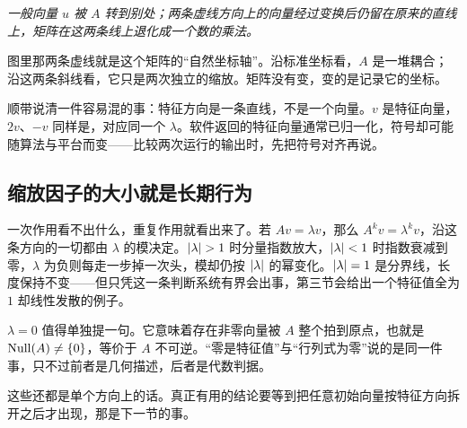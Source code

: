 \begin{center}

\emph{一般向量 \(u\) 被 \(A\) 转到别处；两条虚线方向上的向量经过变换后仍留在原来的直线上，矩阵在这两条线上退化成一个数的乘法。}
\end{center}

图里那两条虚线就是这个矩阵的``自然坐标轴''。沿标准坐标看，\(A\) 是一堆耦合；沿这两条斜线看，它只是两次独立的缩放。矩阵没有变，变的是记录它的坐标。

顺带说清一件容易混的事：特征方向是一条直线，不是一个向量。\(v\) 是特征向量，\(2v\)、\(-v\) 同样是，对应同一个 \(\lambda\)。软件返回的特征向量通常已归一化，符号却可能随算法与平台而变——比较两次运行的输出时，先把符号对齐再说。

\subsection{缩放因子的大小就是长期行为}

一次作用看不出什么，重复作用就看出来了。若 \(Av=\lambda v\)，那么 \(A^k v=\lambda^k v\)，沿这条方向的一切都由 \(\lambda\) 的模决定。\(\abs{\lambda}>1\) 时分量指数放大，\(\left|\lambda\right|<1\) 时指数衰减到零，\(\lambda\) 为负则每走一步掉一次头，模却仍按 \(\left|\lambda\right|\) 的幂变化。\(\left|\lambda\right|=1\) 是分界线，长度保持不变——但只凭这一条判断系统有界会出事，第三节会给出一个特征值全为 \(1\) 却线性发散的例子。

\(\lambda=0\) 值得单独提一句。它意味着存在非零向量被 \(A\) 整个拍到原点，也就是 \(\operatorname{Null}(A)\neq\{0\}\)，等价于 \(A\) 不可逆。``零是特征值''与``行列式为零''说的是同一件事，只不过前者是几何描述，后者是代数判据。

这些还都是单个方向上的话。真正有用的结论要等到把任意初始向量按特征方向拆开之后才出现，那是下一节的事。


